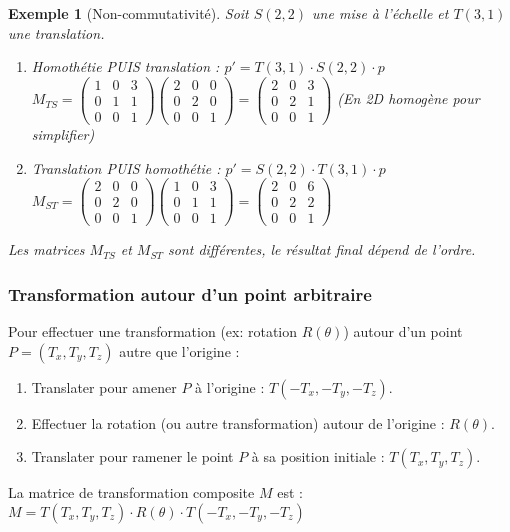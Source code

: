 \documentclass{article}
\newtheorem{example}{Exemple} %
\begin{document}
\begin{example}[Non-commutativité]
Soit $S(2,2)$ une mise à l'échelle et $T(3,1)$ une translation.
\begin{enumerate}
    \item Homothétie PUIS translation : $p' = T(3,1) \cdot S(2,2) \cdot p$
    $M_{TS} = \begin{pmatrix} 1 & 0 & 3 \\ 0 & 1 & 1 \\ 0 & 0 & 1 \end{pmatrix} \begin{pmatrix} 2 & 0 & 0 \\ 0 & 2 & 0 \\ 0 & 0 & 1 \end{pmatrix} = \begin{pmatrix} 2 & 0 & 3 \\ 0 & 2 & 1 \\ 0 & 0 & 1 \end{pmatrix}$
    (En 2D homogène pour simplifier)
    \item Translation PUIS homothétie : $p' = S(2,2) \cdot T(3,1) \cdot p$
    $M_{ST} = \begin{pmatrix} 2 & 0 & 0 \\ 0 & 2 & 0 \\ 0 & 0 & 1 \end{pmatrix} \begin{pmatrix} 1 & 0 & 3 \\ 0 & 1 & 1 \\ 0 & 0 & 1 \end{pmatrix} = \begin{pmatrix} 2 & 0 & 6 \\ 0 & 2 & 2 \\ 0 & 0 & 1 \end{pmatrix}$
\end{enumerate}
Les matrices $M_{TS}$ et $M_{ST}$ sont différentes, le résultat final dépend de l'ordre.
\end{example}

\subsubsection{Transformation autour d'un point arbitraire}
Pour effectuer une transformation (ex: rotation $R(\theta)$) autour d'un point $P=(T_x, T_y, T_z)$ autre que l'origine :
\begin{enumerate}
    \item Translater pour amener $P$ à l'origine : $T(-T_x, -T_y, -T_z)$.
    \item Effectuer la rotation (ou autre transformation) autour de l'origine : $R(\theta)$.
    \item Translater pour ramener le point $P$ à sa position initiale : $T(T_x, T_y, T_z)$.
\end{enumerate}
La matrice de transformation composite $M$ est :
$M = T(T_x, T_y, T_z) \cdot R(\theta) \cdot T(-T_x, -T_y, -T_z)$
\end{document}
